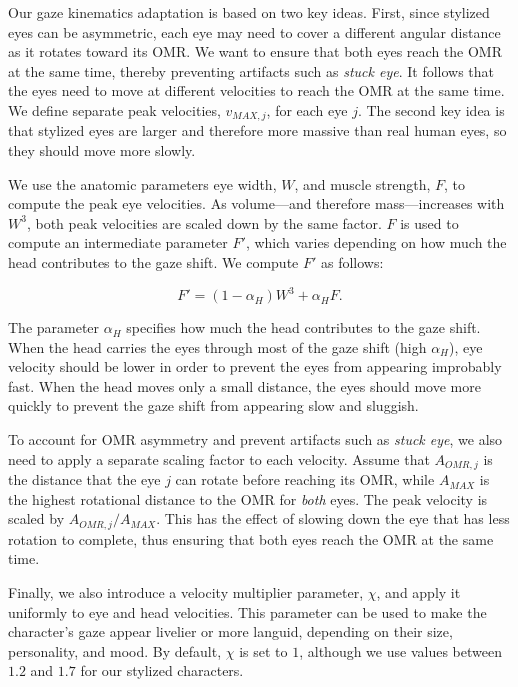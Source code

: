 Our gaze kinematics adaptation is based on two key ideas. First, since stylized eyes can be asymmetric, each eye may need to cover a different angular distance as it rotates toward its OMR. We want to ensure that both eyes reach the OMR at the same time, thereby preventing artifacts such as \emph{stuck eye}. It follows that the eyes need to move at different velocities to reach the OMR at the same time. We define separate peak velocities, $v_{MAX,j}$, for each eye $j$. The second key idea is that stylized eyes are larger and therefore more massive than real human eyes, so they should move more slowly.

We use the anatomic parameters eye width, $W$, and muscle strength, $F$, to compute the peak eye velocities. As volume---and therefore mass---increases with $W^3$, both peak velocities are scaled down by the same factor. $F$ is used to compute an intermediate parameter $F'$, which varies depending on how much the head contributes to the gaze shift. We compute $F'$ as follows:

\begin{equation}
F' = ( 1 - \alpha_H ) W^3 + \alpha_H F.
\end{equation}

The parameter $\alpha_H$ specifies how much the head contributes to the gaze shift. When the head carries the eyes through most of the gaze shift (high $\alpha_H$), eye velocity should be lower in order to prevent the eyes from appearing improbably fast. When the head moves only a small distance, the eyes should move more quickly to prevent the gaze shift from appearing slow and sluggish.

To account for OMR asymmetry and prevent artifacts such as \textit{stuck eye}, we also need to apply a separate scaling factor to each velocity. Assume that $A_{OMR,j}$ is the distance that the eye $j$ can rotate before reaching its OMR, while $A_{MAX}$ is the highest rotational distance to the OMR for \emph{both} eyes. The peak velocity is scaled by $A_{OMR,j}/A_{MAX}$. This has the effect of slowing down the eye that has less rotation to complete, thus ensuring that both eyes reach the OMR at the same time.

Finally, we also introduce a velocity multiplier parameter, $\chi$, and apply it uniformly to eye and head velocities. This parameter can be used to make the character's gaze appear livelier or more languid, depending on their size, personality, and mood. By default, $\chi$ is set to $1$, although we use values between $1.2$ and $1.7$ for our stylized characters.

